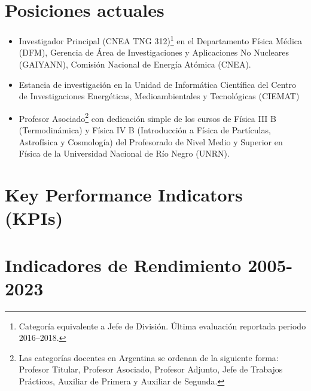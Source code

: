 \section*{Posiciones actuales}
\begin{itemize}
    \item {} Investigador Principal (CNEA TNG 312)\footnote{Categoría equivalente a Jefe de División. Última evaluación reportada periodo 2016--2018.} en el Departamento Física Médica (DFM), Gerencia de Área de Investigaciones y Aplicaciones No Nucleares (GAIYANN), Comisión Nacional de Energía Atómica (CNEA).
    \item {} Estancia de investigación en la Unidad de Informática Científica del Centro de Investigaciones Energéticas, Medioambientales y Tecnológicas (CIEMAT)
    \item {} Profesor Asociado\footnote{Las categorías docentes en Argentina se ordenan de la siguiente forma: Profesor Titular, Profesor Asociado, Profesor Adjunto, Jefe de Trabajos Prácticos, Auxiliar de Primera y Auxiliar de Segunda.} con dedicación simple de los cursos de Física III B (Termodinámica) y Física IV B (Introducción a Física de Partículas, Astrofísica y Cosmología) del Profesorado de Nivel Medio y Superior en Física de la Universidad Nacional de Río Negro (UNRN).
\end{itemize}
\fi

\ifeng
\section*{Key Performance Indicators (KPIs)}

\else
\section*{Indicadores de Rendimiento 2005-2023}

